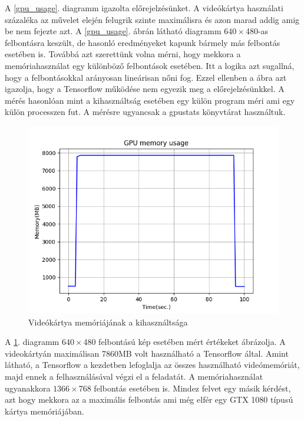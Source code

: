 \documentclass[12pt, a4paper, oneside]{book}
\theoremstyle{tetel}
\begin{document}
A \ref{gpu_usage}. diagramm igazolta előrejelzésünket. A videókártya használati százaléka az művelet elején felugrik szinte maximálisra és azon marad addig amig be nem fejezte azt. A \ref{gpu_usage}. ábrán látható diagramm $640 \times $480-as felbontásra keszült, de hasonló eredményeket kapunk bármely más felbontás esetében is.
\newline
\indent
Továbbá azt szerettünk volna mérni, hogy mekkora a memóriahasználat egy különböző felbontások esetében. Itt a logika azt sugallná, hogy a felbontásokkal arányosan lineárisan nőni fog. Ezzel ellenben a ábra azt igazolja, hogy a Tensorflow működése nem egyezik meg a előrejelzésünkkel. A mérés hasonlóan mint a kihasználtság esetében egy külön program méri ami egy külön processzen fut. A mérésre ugyancsak a gpustats könyvtárat használtuk.

\begin{figure}[!htbp]
	\begin{center}
		\includegraphics[scale=0.8]{gpu_memory_usage.png}
		\caption{Videókártya memóriájának a kihasználtsága}
		\label{gpu_memory_usage}
	\end{center}
\end{figure} 

A \ref{gpu_memory_usage}. diagramm $640 \times $480 felbontású kép esetében mért értékeket ábrázolja. A videokártyán maximálisan 7860MB volt használható a Tensorflow által. Amint látható, a Tensorflow a kezdetben lefoglalja az összes használható videómemóriát, majd ennek a felhasználásával végzi el a feladatát. A memóriahasználat ugyanakkora $1366 \times $768 felbontás esetében is. Mindez felvet egy másik kérdést, azt hogy mekkora az a maximális felbontás ami még elfér egy GTX 1080 típusú kártya memóriájában.
\end{document}
